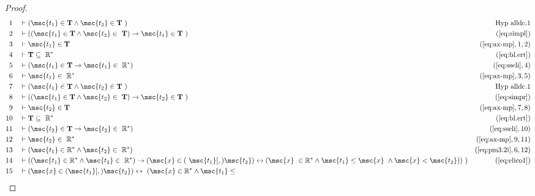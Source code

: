\begin{proof}
\begin{align}
  1 &&  & \vdash ( \msc{t_1} \in \mathbf{T} \wedge \msc{t_2} \in \mathbf{T}
     ~)&\text{Hyp~alldc.1}\notag%
  \\ 2 &&  & \vdash ( ( \msc{t_1} \in \mathbf{T} \wedge \msc{t_2} \in
     ~\mathbf{T} ) \rightarrow \msc{t_1} \in \mathbf{T}
     ~)&(\mbox{\ref{eq:simpl}})\notag
  \\ 3 &&  & \vdash \msc{t_1} \in \mathbf{T}&(\mbox{\ref{eq:ax-mp}},1,2)\notag
  \\ 4 &&  & \vdash \mathbf{T} \subseteq
     ~\mathbb{R}^{*}&(\mbox{\ref{eq:bl.ert}})\notag
  \\ 5 &&  & \vdash ( \msc{t_1} \in \mathbf{T} \rightarrow \msc{t_1} \in
     ~\mathbb{R}^{*} )&(\mbox{\ref{eq:sseli}},4)\notag
  \\ 6 &&  & \vdash \msc{t_1} \in
     ~\mathbb{R}^{*}&(\mbox{\ref{eq:ax-mp}},3,5)\notag
  \\ 7 &&  & \vdash ( \msc{t_1} \in \mathbf{T} \wedge \msc{t_2} \in \mathbf{T}
     ~)&\text{Hyp~alldc.1}\notag%
  \\ 8 &&  & \vdash ( ( \msc{t_1} \in \mathbf{T} \wedge \msc{t_2} \in
     ~\mathbf{T} ) \rightarrow \msc{t_2} \in \mathbf{T}
     ~)&(\mbox{\ref{eq:simpr}})\notag
  \\ 9 &&  & \vdash \msc{t_2} \in \mathbf{T}&(\mbox{\ref{eq:ax-mp}},7,8)\notag
  \\ 10 &&  & \vdash \mathbf{T} \subseteq
     ~\mathbb{R}^{*}&(\mbox{\ref{eq:bl.ert}})\notag
  \\ 11 &&  & \vdash ( \msc{t_2} \in \mathbf{T} \rightarrow \msc{t_2} \in
     ~\mathbb{R}^{*} )&(\mbox{\ref{eq:sseli}},10)\notag
  \\ 12 &&  & \vdash \msc{t_2} \in
     ~\mathbb{R}^{*}&(\mbox{\ref{eq:ax-mp}},9,11)\notag
  \\ 13 &&  & \vdash ( \msc{t_1} \in \mathbb{R}^{*} \wedge \msc{t_2} \in
     ~\mathbb{R}^{*} )&(\mbox{\ref{eq:pm3.2i}},6,12)\notag
  \\ 14 &&  & \vdash ( ( \msc{t_1} \in \mathbb{R}^{*} \wedge \msc{t_2} \in
     ~\mathbb{R}^{*} ) \rightarrow ( \msc{x} \in (
     ~\msc{t_1} [,) \msc{t_2} ) \leftrightarrow ( \msc{x}
     ~\in \mathbb{R}^{*} \wedge \msc{t_1} \le \msc{x}
     ~\wedge \msc{x} < \msc{t_2} ) )
     ~)&(\mbox{\ref{eq:elico1}})\notag
  \\ 15 &&  & \vdash ( \msc{x} \in ( \msc{t_1} [,) \msc{t_2} ) \leftrightarrow
     ~( \msc{x} \in \mathbb{R}^{*} \wedge \msc{t_1} \le

\end{align}
\end{proof}
